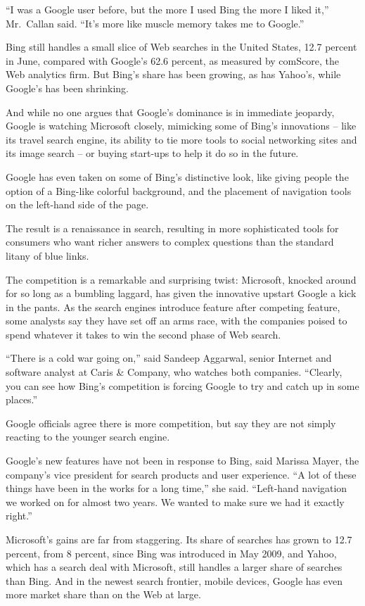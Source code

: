 ﻿\documentclass[12pt]{article}
\begin{document}
``I was a Google user before, but the more I used Bing the more I liked it,'' Mr.~Callan said.
``It's more like muscle memory takes me to Google.''

Bing still handles a small slice of Web searches in the United States, 12.7 percent in June,
compared with Google's 62.6 percent, as measured by comScore, the Web analytics firm. But Bing's
share has been growing, as has Yahoo's, while Google's has been shrinking.

And while no one argues that Google's dominance is in immediate jeopardy, Google is watching
Microsoft closely, mimicking some of Bing's innovations -- like its travel search engine, its
ability to tie more tools to social networking sites and its image search -- or buying start-ups to
help it do so in the future.

Google has even taken on some of Bing's distinctive look, like giving people the option of a
Bing-like colorful background, and the placement of navigation tools on the left-hand side of the
page.

The result is a renaissance in search, resulting in more sophisticated tools for consumers who want
richer answers to complex questions than the standard litany of blue links.

The competition is a remarkable and surprising twist: Microsoft, knocked around for so long as a
bumbling laggard, has given the innovative upstart Google a kick in the pants. As the search engines
introduce feature after competing feature, some analysts say they have set off an arms race, with
the companies poised to spend whatever it takes to win the second phase of Web search.

``There is a cold war going on,'' said Sandeep Aggarwal, senior Internet and software analyst at
Caris \& Company, who watches both companies. ``Clearly, you can see how Bing's competition is
forcing Google to try and catch up in some places.''

Google officials agree there is more competition, but say they are not simply reacting to the
younger search engine.

Google's new features have not been in response to Bing, said Marissa Mayer, the company's vice
president for search products and user experience. ``A lot of these things have been in the works
for a long time,'' she said. ``Left-hand navigation we worked on for almost two years. We wanted to
make sure we had it exactly right.''

Microsoft's gains are far from staggering. Its share of searches has grown to 12.7 percent, from 8
percent, since Bing was introduced in May 2009, and Yahoo, which has a search deal with Microsoft,
still handles a larger share of searches than Bing. And in the newest search frontier, mobile
devices, Google has even more market share than on the Web at large.
\end{document}
